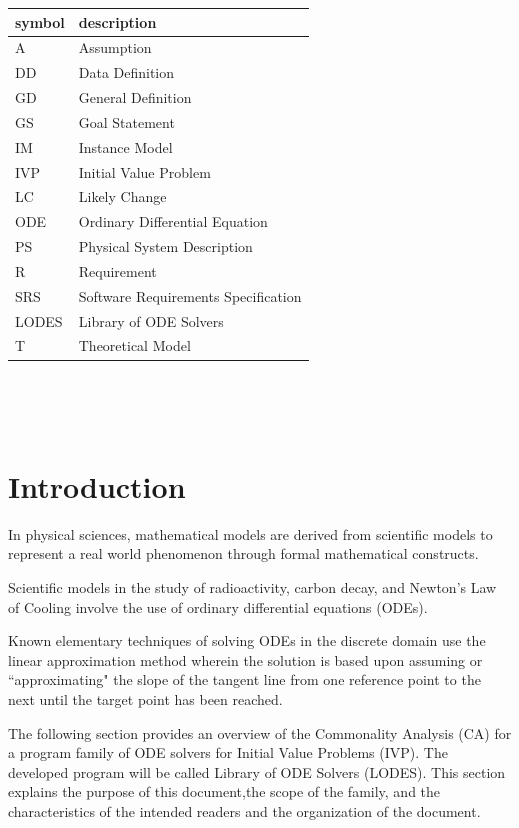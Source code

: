 \documentclass[12pt]{article}
\newcommand{\famname}{LODES} %
\newcommand{\famdesc}{Library of ODE Solvers}
\begin{document}
\renewcommand{\arraystretch}{1.2}
\begin{tabular}{l l} 
  \toprule		
  \textbf{symbol} & \textbf{description}\\
  \midrule 
  A & Assumption\\
  DD & Data Definition\\
  GD & General Definition\\
  GS & Goal Statement\\
  IM & Instance Model\\
  IVP & Initial Value Problem\\
  LC & Likely Change\\
  ODE & Ordinary Differential Equation\\
  PS & Physical System Description\\
  R & Requirement\\
  SRS & Software Requirements Specification\\
  \famname{} & \famdesc{}\\
  T & Theoretical Model\\
  \bottomrule
\end{tabular}\\

\newpage

\tableofcontents

~\newpage


\section{Introduction}


In physical sciences, mathematical models are derived from scientific models to
represent a real world phenomenon through formal mathematical constructs.

Scientific models in the study of radioactivity, carbon decay, and Newton's Law of Cooling
involve the use of ordinary differential equations (ODEs).

Known elementary techniques of solving ODEs in the discrete domain use the linear approximation
method wherein the solution is based upon assuming or ``approximating" the slope of the tangent
line from one reference point to the next until the target point has been reached.

The following section provides an overview of the Commonality Analysis (CA) for a program family of ODE solvers for Initial Value Problems (IVP). The developed program will be
called \famdesc{} (\famname{}). This section explains the purpose of this
document,the scope of the family, and the characteristics of the intended readers
and the organization of the document.
\end{document}
